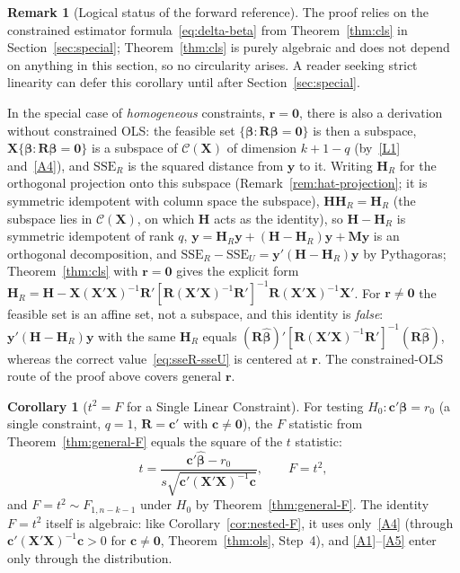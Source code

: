 \documentclass[12pt,a4paper]{article}
\theoremstyle{definition}
\newtheorem{corollary}[theorem]{Corollary}
\newtheorem{remark}[theorem]{Remark}
\newcommand{\SSE}{\mathrm{SSE}}
\newcommand{\bX}{\mathbf{X}}
\newcommand{\by}{\mathbf{y}}
\def\bb{\boldsymbol{\beta}}
\newcommand{\bH}{\mathbf{H}}
\newcommand{\bM}{\mathbf{M}}
\newcommand{\bR}{\mathbf{R}}
\newcommand{\br}{\mathbf{r}}
\def\bc{\mathbf{c}}
\newcommand{\bzero}{\mathbf{0}}
\newcommand{\calC}{\mathcal{C}}
\begin{document}
\begin{remark}[Logical status of the forward reference]\label{rem:forward-nestedF}
The proof relies on the constrained estimator formula~\eqref{eq:delta-beta} from Theorem~\ref{thm:cls} in Section~\ref{sec:special}; Theorem~\ref{thm:cls} is purely algebraic and does not depend on anything in this section, so no circularity arises. A reader seeking strict linearity can defer this corollary until after Section~\ref{sec:special}.

In the special case of \emph{homogeneous} constraints, $\br = \bzero$, there is also a derivation without constrained OLS: the feasible set $\{\bb : \bR\bb = \bzero\}$ is then a subspace, $\bX\{\bb : \bR\bb = \bzero\}$ is a subspace of $\calC(\bX)$ of dimension $k + 1 - q$ (by~\ref{L1} and~\ref{A4}), and $\SSE_R$ is the squared distance from $\by$ to it. Writing $\bH_R$ for the orthogonal projection onto this subspace (Remark~\ref{rem:hat-projection}; it is symmetric idempotent with column space the subspace), $\bH\bH_R = \bH_R$ (the subspace lies in $\calC(\bX)$, on which $\bH$ acts as the identity), so $\bH - \bH_R$ is symmetric idempotent of rank $q$, $\by = \bH_R\by + (\bH - \bH_R)\by + \bM\by$ is an orthogonal decomposition, and $\SSE_R - \SSE_U = \by'(\bH - \bH_R)\by$ by Pythagoras; Theorem~\ref{thm:cls} with $\br = \bzero$ gives the explicit form $\bH_R = \bH - \bX(\bX'\bX)^{-1}\bR'[\bR(\bX'\bX)^{-1}\bR']^{-1}\bR(\bX'\bX)^{-1}\bX'$. For $\br \neq \bzero$ the feasible set is an affine set, not a subspace, and this identity is \emph{false}: $\by'(\bH - \bH_R)\by$ with the same $\bH_R$ equals $(\bR\hat{\bb})'[\bR(\bX'\bX)^{-1}\bR']^{-1}(\bR\hat{\bb})$, whereas the correct value~\eqref{eq:sseR-sseU} is centered at $\br$. The constrained-OLS route of the proof above covers general $\br$.
\end{remark}

\begin{corollary}[$t^2 = F$ for a Single Linear Constraint]\label{cor:t2F}
For testing $H_0\colon \bc'\bb = r_0$ (a single constraint, $q = 1$, $\bR = \bc'$ with $\bc \neq \bzero$), the $F$ statistic from Theorem~\ref{thm:general-F} equals the square of the $t$ statistic:
\[
t = \frac{\bc'\hat{\bb} - r_0}{s\sqrt{\bc'(\bX'\bX)^{-1}\bc}}, \qquad F = t^2,
\]
and $F = t^2 \sim F_{1, n-k-1}$ under $H_0$ by Theorem~\ref{thm:general-F}. The identity $F = t^2$ itself is algebraic: like Corollary~\ref{cor:nested-F}, it uses only~\ref{A4} (through $\bc'(\bX'\bX)^{-1}\bc > 0$ for $\bc \neq \bzero$, Theorem~\ref{thm:ols}, Step~4), and \ref{A1}--\ref{A5} enter only through the distribution.
\end{corollary}
\end{document}
